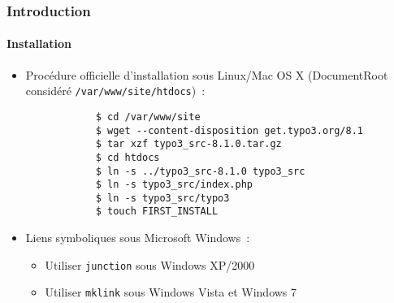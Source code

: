 \begin{frame}[fragile]
	\frametitle{Introduction}
	\framesubtitle{Installation}

	\begin{itemize}
		\item Procédure officielle d'installation sous Linux/Mac OS X\newline
			(DocumentRoot considéré \texttt{/var/www/site/htdocs})~:
		\begin{lstlisting}
			$ cd /var/www/site
			$ wget --content-disposition get.typo3.org/8.1
			$ tar xzf typo3_src-8.1.0.tar.gz
			$ cd htdocs
			$ ln -s ../typo3_src-8.1.0 typo3_src
			$ ln -s typo3_src/index.php
			$ ln -s typo3_src/typo3
			$ touch FIRST_INSTALL
		\end{lstlisting}

		\item Liens symboliques sous Microsoft Windows~:

			\begin{itemize}
				\item Utiliser \texttt{junction} sous Windows XP/2000
				\item Utiliser \texttt{mklink} sous Windows Vista et Windows 7
			\end{itemize}

	\end{itemize}
\end{frame}

